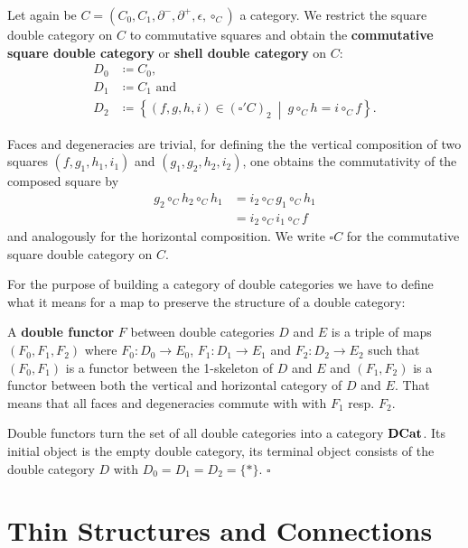 \begin{example} \label{def:shell-dbl-cat}
Let again be $C = (C_0, C_1, \partial^-, \partial^+, \epsilon, \circ_C)$ a category.
We restrict the square double category on $C$ to commutative squares and obtain
the \textbf{commutative square double category} or \textbf{shell double category}
on $C$:
\begin{align*}
D_0 &\coloneqq C_0 \text{,} \\
D_1 &\coloneqq C_1 \text{ and } \\
D_2 &\coloneqq \left\{ (f, g, h, i) \in (\square'C)_2 ~\middle|~ g \circ_C h = i \circ_C f \right\} \text{.}
\end{align*}

Faces and degeneracies are trivial, for defining the the vertical composition of
two squares $(f, g_1, h_1, i_1)$ and $(g_1, g_2, h_2, i_2)$, one obtains the
commutativity of the composed square by
\begin{align*}
g_2 \circ_C h_2 \circ_C h_1 &= i_2 \circ_C g_1 \circ_C h_1 \\
	&= i_2 \circ_C i_1 \circ_C f
\end{align*}
and analogously for the horizontal composition. We write $\square C$ for the
commutative square double category on $C$.
\end{example}

For the purpose of building a category of double categories we have to define what
it means for a map to preserve the structure of a double category:

\begin{defn} \label{def:dbl-functor}
A \textbf{double functor} $F$ between double categories $D$ and $E$ is a triple of maps
$(F_0, F_1, F_2)$ where $F_0 : D_0 \to E_0$, $F_1 : D_1 \to E_1$ and $F_2 : D_2
\to E_2$ such that $(F_0,F_1)$ is a functor between the 1-skeleton of $D$ and $E$
and $(F_1,F_2)$ is a functor between both the vertical and horizontal category
of $D$ and $E$. That means that all faces and degeneracies commute with with $F_1$
resp. $F_2$.
\end{defn}

\begin{lemma} \label{def:cat-of-dbl-cat}
Double functors turn the set of all double categories into a category $\mathbf{DCat}$.
Its initial object is the empty double category, its terminal object consists of the
double category $D$ with $D_0 = D_1 = D_2 = \{\ast\}$.
\hfill $\square$
\end{lemma}

\section{Thin Structures and Connections}


